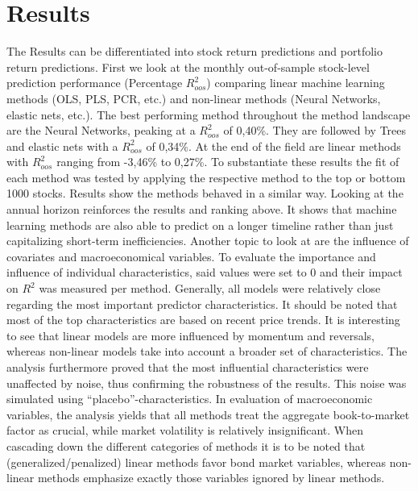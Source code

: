 \documentclass{article}
\begin{document}
\section{Results}

The Results can be differentiated into stock return predictions and portfolio return predictions. 
\newline
First we look at the monthly out-of-sample stock-level prediction performance (Percentage $R^{2}_{oos}$) comparing linear machine learning methods (OLS, PLS, PCR, etc.) and non-linear methods (Neural Networks, elastic nets, etc.). The best performing method throughout the method landscape are the Neural Networks, peaking at a $R^{2}_{oos}$ of 0,40\%. They are followed by Trees and elastic nets with a $R^{2}_{oos}$ of 0,34\%. At the end of the field are linear methods with $R^{2}_{oos}$ ranging from -3,46\% to 0,27\%. To substantiate these results the fit of each method was tested by applying the respective method to the top or bottom 1000 stocks. Results show the methods behaved in a similar way. 
\newline
Looking at the annual horizon reinforces the results and ranking above. It shows that machine learning methods are also able to predict on a longer timeline rather than just capitalizing short-term inefficiencies.
\newline
Another topic to look at are the influence of covariates and macroeconomical variables.
To evaluate the importance and influence of individual characteristics, said values were set to 0 and their impact on $R^{2}$ was measured per method. Generally, all models were relatively close regarding the most important predictor characteristics. It should be noted that most of the top characteristics are based on recent price trends. It is interesting to see that linear models are more influenced by momentum and reversals, whereas non-linear models take into account a broader set of characteristics. The analysis furthermore proved that the most influential characteristics were unaffected by noise, thus confirming the robustness of the results. This noise was simulated using “placebo”-characteristics.
In evaluation of macroeconomic variables, the analysis yields that all methods treat the aggregate book-to-market factor as crucial, while market volatility is relatively insignificant. When cascading down the different categories of methods it is to be noted that (generalized/penalized) linear methods favor bond market variables, whereas non-linear methods emphasize exactly those variables ignored by linear methods. 
\end{document}
